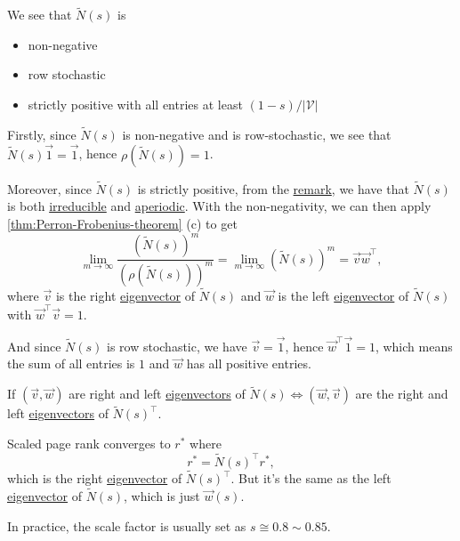\begin{note}
	We see that \(\widetilde{N}(s)\) is
	\begin{itemize}
		\item non-negative
		\item row stochastic
		\item strictly positive with all entries at least \((1-s) / \left\vert \mathcal{V} \right\vert \)
	\end{itemize}
\end{note}
Firstly, since \(\widetilde{N} (s)\) is non-negative and is row-stochastic, we see that \(\widetilde{N} (s)\vec{1} = \vec{1} \), hence \(\rho(\widetilde{N}(s)) = 1\).

Moreover, since \(\widetilde{N} (s)\) is strictly positive, from the \hyperref[rmk:lec11-1]{remark}, we have that \(\widetilde{N} (s)\) is both \hyperref[def:irreducible]{irreducible} and \hyperref[def:aperiodic]{aperiodic}. With the non-negativity, we can then apply \autoref{thm:Perron-Frobenius-theorem} (c) to get
\[
	\lim\limits_{m \to \infty} \frac{(\widetilde{N} (s))^m}{(\rho (\widetilde{N} (s)))^m} = \lim\limits_{m \to \infty} (\widetilde{N} (s))^m = \vec{v} \vec{w} ^{\top},
\]
where \(\vec{v}\) is the right \hyperref[def:eigenvector]{eigenvector} of \(\widetilde{N}(s)\) and \(\vec{w}\) is the left \hyperref[def:eigenvector]{eigenvector} of \(\widetilde{N}(s)\) with \(\vec{w}^{\top} \vec{v} = 1\).

And since \(\widetilde{N}(s)\) is row stochastic, we have \(\vec{v} = \vec{1}\), hence \(\vec{w}^{\top}\vec{1} = 1\), which means the sum of all entries is \(1\) and \(\vec{w}\) has all positive entries.

If \((\vec{v}, \vec{w})\) are right and left \hyperref[def:eigenvector]{eigenvectors} of \(\widetilde{N}(s) \iff (\vec{w}, \vec{v})\) are the right and left \hyperref[def:eigenvector]{eigenvectors} of \(\widetilde{N}(s)^{\top}\).

\begin{remark}
	Scaled page rank converges to \(r^{\ast} \) where
	\[
		r^{\ast} = \widetilde{N}(s)^{\top}r^{\ast},
	\]
	which is the right \hyperref[def:eigenvector]{eigenvector} of \(\widetilde{N}(s)^{\top}\). But it's the same as the left \hyperref[def:eigenvector]{eigenvector} of \(\widetilde{N}(s)\), which is just \(\vec{w}(s)\).
\end{remark}

\begin{note}
	In practice, the scale factor is usually set as \(s \cong 0.8 \sim 0.85\).
\end{note}
